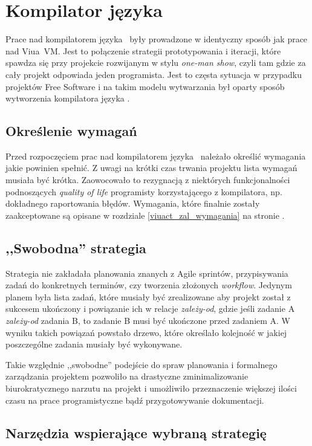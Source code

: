\section{Kompilator języka \ViuAct}

Prace nad kompilatorem języka \ViuAct\ były prowadzone w identyczny sposób jak
prace nad Viua~VM. Jest to połączenie strategii prototypowania i iteracji, które
spawdza się przy projekcie rozwijanym w stylu \emph{one-man show}, czyli tam
gdzie za cały projekt odpowiada jeden programista. Jest to częsta sytuacja w
przypadku projektów Free Software i na takim modelu wytwarzania był oparty
sposób wytworzenia kompilatora języka \ViuAct.

\subsection{Określenie wymagań}

Przed rozpoczęciem prac nad kompilatorem języka \ViuAct\ należało określić
wymagania jakie powinien spełnić. Z uwagi na krótki czas trwania projektu lista
wymagań musiała być krótka. Zaowocowało to rezygnacją z niektórych
funkcjonalności podnoszących \emph{quality of life} programisty korzystającego z
kompilatora, np. dokładnego raportowania błędów. Wymagania, które finalnie
zostały zaakceptowane są opisane w rozdziale \ref{viuact_zal_wymagania} na
stronie \pageref{viuact_zal_wymagania}.

\subsection{,,Swobodna'' strategia}

Strategia nie zakładała planowania znanych z Agile sprintów, przypisywania zadań
do konkretnych terminów, czy tworzenia złożonych \emph{workflow}. Jedynym planem
była lista zadań, które musiały być zrealizowane aby projekt został z sukcesem
ukończony i powiązanie ich w relacje \emph{zależy-od}, gdzie jeśli zadanie A
\emph{zależy-od} zadania B, to zadanie B musi być ukończone przed zadaniem A.
W wyniku takich powiązań powstało drzewo, które określało kolejność w jakiej
poszczególne zadania musiały być wykonywane.

Takie względnie ,,swobodne'' podejście do spraw planowania i formalnego
zarządzania projektem pozwoliło na drastyczne zminimalizowanie biurokratycznego
narzutu na projekt i umożliwiło przeznaczenie większej ilości czasu na prace
programistyczne bądź przygotowywanie dokumentacji.

\subsection{Narzędzia wspierające wybraną strategię}


